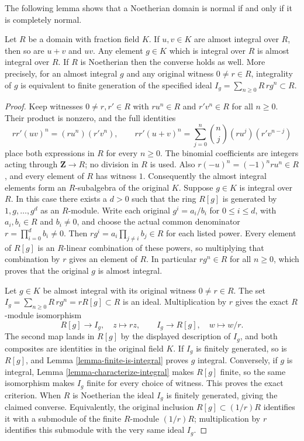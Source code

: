 \noindent
The following lemma shows that a Noetherian domain is normal
if and only if it is completely normal.

\begin{lemma}
\label{lemma-almost-integral}
Let $R$ be a domain with fraction field $K$.
If $u, v \in K$ are almost integral over $R$, then so are
$u + v$ and $uv$. Any element $g \in K$ which is integral over $R$
is almost integral over $R$. If $R$ is Noetherian
then the converse holds as well. More precisely, for an almost
integral $g$ and any original witness $0\ne r\in R$, integrality
of $g$ is equivalent to finite generation of the specified ideal
$I_g=\sum_{n\geq0}R\,rg^n\subset R$.
\end{lemma}

\begin{proof}
Keep witnesses $0\ne r,r'\in R$ with $ru^n\in R$ and
$r'v^n\in R$ for all $n\geq0$. Their product is nonzero, and
the full identities
$$
rr'(uv)^n=(ru^n)(r'v^n),\qquad
rr'(u+v)^n=\sum_{j=0}^n\binom nj(ru^j)(r'v^{n-j})
$$
place both expressions in $R$ for every $n\geq0$. The binomial
coefficients are integers acting through $\mathbf Z\to R$;
no division in $R$ is used. Also $r(-u)^n=(-1)^nru^n\in R$,
and every element of $R$ has witness $1$. Consequently the
almost integral elements form an $R$-subalgebra of the original $K$.
Suppose $g \in K$ is integral over $R$.
In this case there exists a $d > 0$ such that
the ring $R[g]$ is generated by $1, g, \ldots, g^d$ as an $R$-module.
Write each original $g^i=a_i/b_i$ for $0\leq i\leq d$,
with $a_i,b_i\in R$ and $b_i\ne0$, and choose the actual common
denominator $r=\prod_{i=0}^d b_i\ne0$. Then
$rg^i=a_i\prod_{j\ne i}b_j\in R$ for each listed power.
Every element of $R[g]$ is an $R$-linear combination of these
powers, so multiplying that combination by $r$ gives an element
of $R$. In particular $rg^n\in R$ for all $n\geq0$,
which proves that the original $g$ is almost integral.

\medskip\noindent
Let $g\in K$ be almost integral with its original witness
$0\ne r\in R$. The set
$I_g=\sum_{n\geq0}R\,rg^n=rR[g]\subset R$ is an ideal.
Multiplication by $r$ gives the exact $R$-module isomorphism
$$
R[g]\longrightarrow I_g,\quad z\longmapsto rz,
\qquad I_g\longrightarrow R[g],\quad w\longmapsto w/r.
$$
The second map lands in $R[g]$ by the displayed description of
$I_g$, and both composites are identities in the original field $K$.
If $I_g$ is finitely generated, so is $R[g]$, and Lemma
\ref{lemma-finite-is-integral} proves $g$ integral. Conversely,
if $g$ is integral, Lemma \ref{lemma-characterize-integral}
makes $R[g]$ finite, so the same isomorphism makes $I_g$ finite
for every choice of witness. This proves the exact criterion.
When $R$ is Noetherian the ideal $I_g$ is finitely generated,
giving the claimed converse. Equivalently, the original inclusion
$R[g]\subset(1/r)R$ identifies it with a submodule of the finite
$R$-module $(1/r)R$; multiplication by $r$ identifies this
submodule with the very same ideal $I_g$.
\end{proof}

